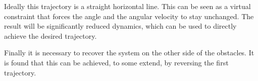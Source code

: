 Ideally this trajectory is a straight horizontal line. This can be seen as a virtual constraint that forces the angle and the angular velocity to stay unchanged. The result will be significantly reduced dynamics, which can be used to directly achieve the desired trajectory.

Finally it is necessary to recover the system on the other side of the obstacles. It is found that this can be achieved, to some extend, by reversing the first trajectory.